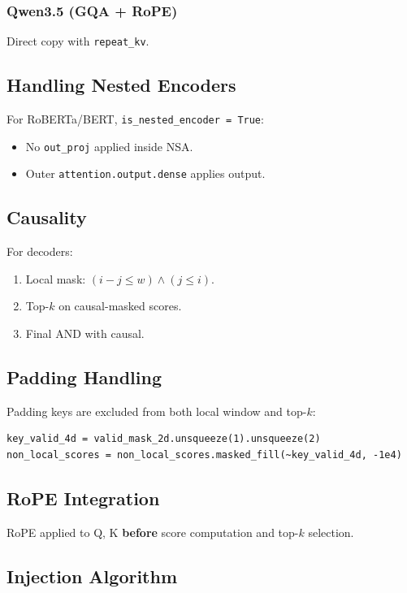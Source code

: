 \subsubsection{Qwen3.5 (GQA + RoPE)}

Direct copy with \texttt{repeat\_kv}.

\subsection{Handling Nested Encoders}

For RoBERTa/BERT, \texttt{is\_nested\_encoder = True}:
\begin{itemize}
\item No \texttt{out\_proj} applied inside NSA.
\item Outer \texttt{attention.output.dense} applies output.

\end{itemize}
\subsection{Causality}

For decoders:
\begin{enumerate}
\item Local mask: $(i - j \leq w) \land (j \leq i)$.
\item Top-$k$ on causal-masked scores.
\item Final AND with causal.

\end{enumerate}
\subsection{Padding Handling}

Padding keys are excluded from both local window and top-$k$:

\begin{lstlisting}
key_valid_4d = valid_mask_2d.unsqueeze(1).unsqueeze(2)
non_local_scores = non_local_scores.masked_fill(~key_valid_4d, -1e4)
\end{lstlisting}

\subsection{RoPE Integration}

RoPE applied to Q, K \textbf{before} score computation and top-$k$ selection.

\subsection{Injection Algorithm}

